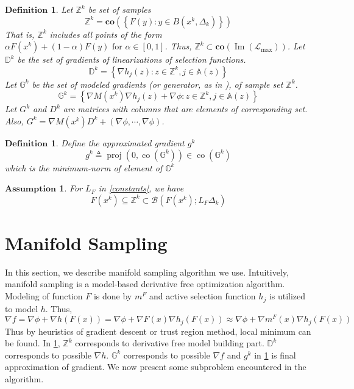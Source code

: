 \documentclass[10pt, oneside]{article}
\newtheorem{defn}[thm]{$\mathbf{Definition}$}
\newtheorem{asp}[thm]{$\mathbf{Assumption}$}
\begin{document}
\begin{defn}
\label{ZDG}
Let $\mathbb{Z}^{k}$ be set of samples 
$$
\mathbb{Z}^{k}=\mathbf{co}\left(\left\{F(y):y\in B(x^k,\Delta_k)\right\}\right)
$$
That is, $\mathbb{Z}^{k}$ includes all points of the form $\alpha F\left(x^{k}\right)+(1-\alpha) F(y) \text { for } \alpha \in[0,1]$. Thus, $\mathbb{Z}^k\subset\mathbf{c o}\left(\operatorname{Im}\left(\mathcal{L}_{\max }\right)\right)$. Let $\mathbb{D}^{k}$ be the set of gradients of linearizations of selection functions.
$$
\mathbb{D}^{k}=\left\{\nabla h_{j}(z): z \in \mathbb{Z}^{k}, j \in \mathbb{A}(z)\right\}
$$
Let $\mathbb{G}^{k}$ be the set of modeled gradients (or generator, as in  \cite{manifold}), of sample set $\mathbb{Z}^{k}$. 
$$
\mathbb{G}^{k}=\left\{\nabla M\left(x^{k}\right) \nabla h_{j}(z)+\nabla \phi: z \in \mathbb{Z}^{k}, j \in \mathbb{A}(z)\right\}
$$
Let $G^{k}$ and $D^{k}$ are matrices with columns that are elements of corresponding set. Also, $G^{k}=\nabla M\left(x^{k}\right) D^{k}+\left( \nabla\phi, \cdots, \nabla \phi \right)$.
\end{defn}


\begin{defn}
\label{g}
Define the approximated gradient $g^k$
\begin{equation}
\label{defg}
g^{k} \triangleq \operatorname{proj}\left(0, \operatorname{co}\left(\mathbb{G}^{k}\right)\right) \in \operatorname{co}\left(\mathbb{G}^{k}\right)
\end{equation}
which is the minimum-norm of element of $\mathbb{G}^{k}$
\end{defn}




\begin{asp}
For $L_F$ in \ref{constants}, we have
$$
F\left(x^{k}\right) \subseteq \mathbb{Z}^{k} \subset \mathcal{B}\left(F\left(x^{k}\right) ; L_{F} \Delta_{k}\right)
$$
\end{asp}



\section{Manifold Sampling}

In this section, we describe manifold sampling algorithm we use. Intuitively, manifold sampling is a model-based derivative free optimization algorithm. Modeling of function $F$ is done by $m^F$ and active selection function $h_j$ is utilized to model $h$. Thus, 
$$
\nabla f=\nabla \phi +\nabla h(F(x))=\nabla \phi +\nabla F(x) \nabla h_{j}(F(x)) \approx \nabla \phi +\nabla m^F(x) \nabla h_{j}(F(x))
$$
Thus by heuristics of gradient descent or trust region method, local minimum can be found. In \ref{ZDG}, $\mathbb{Z}^{k}$ corresponds to derivative free model building part. $\mathbb{D}^{k}$ corresponds to possible $\nabla h$. $\mathbb{G}^{k}$ corresponds to possible $\nabla f$ and $g^k$ in \ref{g} is final approximation of gradient. We now present some subproblem encountered in the algorithm. 
\end{document}
